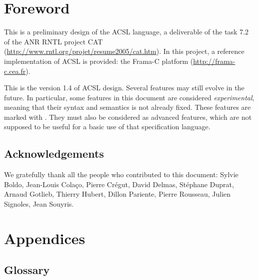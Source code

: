 \documentclass[a4paper,11pt,twoside,openright]{report}
\newcommand{\version}{1.4}
\begin{document}
\chapter*{Foreword}

This is a preliminary design of the ACSL language, a deliverable of
the task 7.2 of the ANR RNTL project CAT
(\url{http://www.rntl.org/projet/resume2005/cat.htm}). In this
project, a reference implementation of ACSL is provided: the Frama-C
platform (\url{http://frama-c.cea.fr}).

This is the version \version{} of ACSL design. Several features may still
evolve in the future. In particular, some features in this document
are considered \emph{experimental}, meaning that their syntax and
semantics is not already fixed.  These features are marked with
\experimental.  They must also be considered as advanced features,
which are not supposed to be useful for a basic use of that
specification language.

\section*{Acknowledgements}

We gratefully thank all the people who contributed to this document:
Sylvie Boldo,
Jean-Louis Cola\c{c}o,
Pierre Cr\'egut,
David Delmas,
St\'ephane Duprat,
Arnaud Gotlieb,
Thierry Hubert,
Dillon Pariente,
Pierre Rousseau,
Julien Signoles,
Jean Souyris.









\appendix

\chapter{Appendices}
\label{chap:appendix}



\section{Glossary}
\label{sec:glossary}
\end{document}

